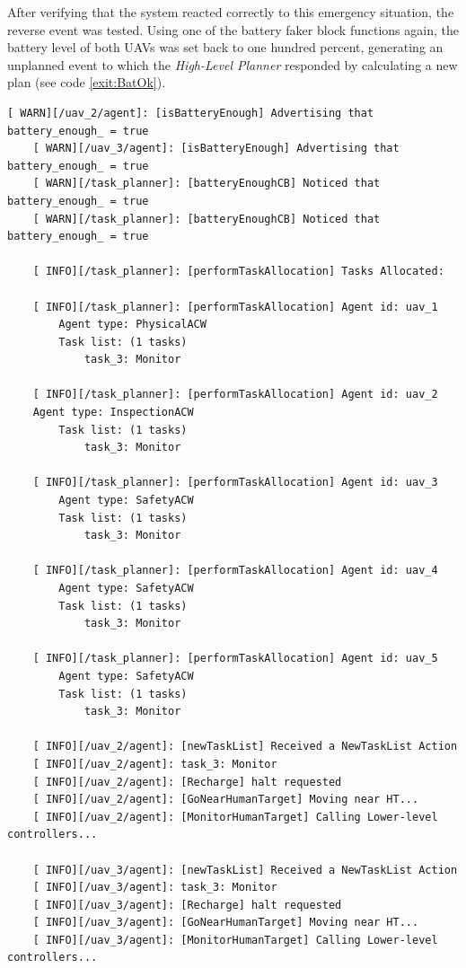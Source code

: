 After verifying that the system reacted correctly to this emergency situation, the reverse event was tested. Using one of the battery faker block functions again, the battery level of both \glspl{UAV} was set back to one hundred percent, generating an unplanned event to which the \emph{High-Level Planner} responded by calculating a new plan (see code \ref{exit:BatOk}).

\begin{lstlisting}[caption={Feedback messages printed after the battery of two UAVs is fully charged}, breaklines=true, label=exit:BatOk]
    [ WARN][/uav_2/agent]: [isBatteryEnough] Advertising that battery_enough_ = true
    [ WARN][/uav_3/agent]: [isBatteryEnough] Advertising that battery_enough_ = true
    [ WARN][/task_planner]: [batteryEnoughCB] Noticed that battery_enough_ = true
    [ WARN][/task_planner]: [batteryEnoughCB] Noticed that battery_enough_ = true
    
    [ INFO][/task_planner]: [performTaskAllocation] Tasks Allocated:
    
    [ INFO][/task_planner]: [performTaskAllocation] Agent id: uav_1
        Agent type: PhysicalACW
        Task list: (1 tasks)
            task_3: Monitor
    
    [ INFO][/task_planner]: [performTaskAllocation] Agent id: uav_2
    Agent type: InspectionACW
        Task list: (1 tasks)
            task_3: Monitor
    
    [ INFO][/task_planner]: [performTaskAllocation] Agent id: uav_3
        Agent type: SafetyACW
        Task list: (1 tasks)
            task_3: Monitor
    
    [ INFO][/task_planner]: [performTaskAllocation] Agent id: uav_4
        Agent type: SafetyACW
        Task list: (1 tasks)
            task_3: Monitor
    
    [ INFO][/task_planner]: [performTaskAllocation] Agent id: uav_5
        Agent type: SafetyACW
        Task list: (1 tasks)
            task_3: Monitor
    
    [ INFO][/uav_2/agent]: [newTaskList] Received a NewTaskList Action
    [ INFO][/uav_2/agent]: task_3: Monitor
    [ INFO][/uav_2/agent]: [Recharge] halt requested
    [ INFO][/uav_2/agent]: [GoNearHumanTarget] Moving near HT...
    [ INFO][/uav_2/agent]: [MonitorHumanTarget] Calling Lower-level controllers...
    
    [ INFO][/uav_3/agent]: [newTaskList] Received a NewTaskList Action
    [ INFO][/uav_3/agent]: task_3: Monitor
    [ INFO][/uav_3/agent]: [Recharge] halt requested
    [ INFO][/uav_3/agent]: [GoNearHumanTarget] Moving near HT...
    [ INFO][/uav_3/agent]: [MonitorHumanTarget] Calling Lower-level controllers...
\end{lstlisting}

